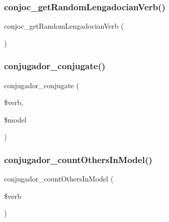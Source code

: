 \subsubsection{\texorpdfstring{conjoc\+\_\+get\+Random\+Lengadocian\+Verb()}{conjoc\_getRandomLengadocianVerb()}}
{\footnotesize\ttfamily conjoc\+\_\+get\+Random\+Lengadocian\+Verb (\begin{DoxyParamCaption}{ }\end{DoxyParamCaption})}

\hypertarget{conjoc__web_form_8inc_a5d341264c049e9bda5fd2d0acce4dfd7}{}\label{conjoc__web_form_8inc_a5d341264c049e9bda5fd2d0acce4dfd7} 
\subsubsection{\texorpdfstring{conjugador\+\_\+conjugate()}{conjugador\_conjugate()}}
{\footnotesize\ttfamily conjugador\+\_\+conjugate (\begin{DoxyParamCaption}\item[{}]{\$verb,  }\item[{}]{\$model }\end{DoxyParamCaption})}

\hypertarget{conjoc__web_form_8inc_ac96a30f96cb3957ed4ac47c4eb40df10}{}\label{conjoc__web_form_8inc_ac96a30f96cb3957ed4ac47c4eb40df10} 
\subsubsection{\texorpdfstring{conjugador\+\_\+count\+Others\+In\+Model()}{conjugador\_countOthersInModel()}}
{\footnotesize\ttfamily conjugador\+\_\+count\+Others\+In\+Model (\begin{DoxyParamCaption}\item[{}]{\$verb }\end{DoxyParamCaption})}

\hypertarget{conjoc__web_form_8inc_a16562f736e2ff741407adb1ceb3c9170}{}\label{conjoc__web_form_8inc_a16562f736e2ff741407adb1ceb3c9170} 
